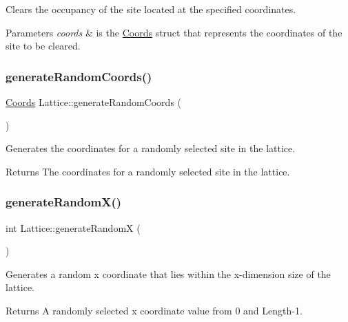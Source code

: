 Clears the occupancy of the site located at the specified coordinates. 


\begin{DoxyParams}{Parameters}
{\em coords} & is the \hyperlink{struct_coords}{Coords} struct that represents the coordinates of the site to be cleared. \\
\hline
\end{DoxyParams}
\mbox{\label{class_lattice_a9fbb3c8bc23999ff685b6837beb62606}} 
\subsubsection{\texorpdfstring{generate\+Random\+Coords()}{generateRandomCoords()}}
{\footnotesize\ttfamily \hyperlink{struct_coords}{Coords} Lattice\+::generate\+Random\+Coords (\begin{DoxyParamCaption}{ }\end{DoxyParamCaption})}



Generates the coordinates for a randomly selected site in the lattice. 

\begin{DoxyReturn}{Returns}
The coordinates for a randomly selected site in the lattice. 
\end{DoxyReturn}
\mbox{\label{class_lattice_ab78435e50e3bf9f376c04fc305785bb4}} 
\subsubsection{\texorpdfstring{generate\+Random\+X()}{generateRandomX()}}
{\footnotesize\ttfamily int Lattice\+::generate\+RandomX (\begin{DoxyParamCaption}{ }\end{DoxyParamCaption})}



Generates a random x coordinate that lies within the x-\/dimension size of the lattice. 

\begin{DoxyReturn}{Returns}
A randomly selected x coordinate value from 0 and Length-\/1. 
\end{DoxyReturn}
\mbox{\label{class_lattice_a180a9d79a40b1a0a092c8ab489569700}} 
